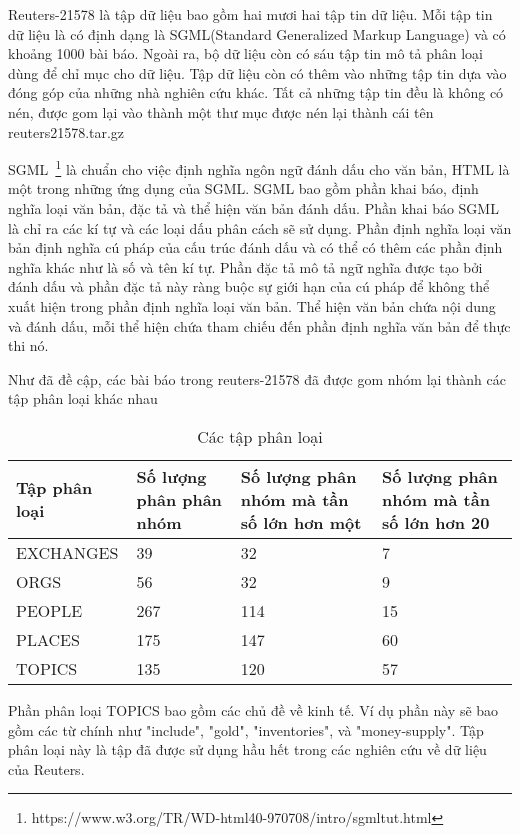 Reuters-21578 là tập dữ liệu bao gồm hai mươi hai tập tin dữ liệu.
Mỗi tập tin dữ liệu là có định dạng là SGML(Standard Generalized Markup Language) và có khoảng 1000 bài báo.
Ngoài ra, bộ dữ liệu còn có sáu tập tin mô tả phân loại dùng để chỉ mục cho dữ liệu.
Tập dữ liệu còn có thêm vào những tập tin dựa vào đóng góp của những nhà nghiên cứu khác.
Tất cả những tập tin đều là không có nén, được gom lại vào thành một thư mục được nén lại thành cái tên reuters21578.tar.gz

SGML~\footnote{https://www.w3.org/TR/WD-html40-970708/intro/sgmltut.html} là chuẩn cho việc định nghĩa ngôn ngữ đánh dấu cho văn bản, HTML là một trong những ứng dụng của SGML.
SGML bao gồm phần khai báo, định nghĩa loại văn bản, đặc tả và thể hiện văn bản đánh dấu.
Phần khai báo SGML là chỉ ra các kí tự và các loại dấu phân cách sẽ sử dụng.
Phần định nghĩa loại văn bản định nghĩa cú pháp của cấu trúc đánh dấu và có thể có thêm các phần định nghĩa khác như là số và tên kí tự.
Phần đặc tả mô tả ngữ nghĩa được tạo bởi đánh dấu và phần đặc tả này ràng buộc sự giới hạn của cú pháp để không thể xuất hiện trong phần định nghĩa loại văn bản.
Thể hiện văn bản chứa nội dung và đánh dấu, mỗi thể hiện chứa tham chiếu đến phần định nghĩa văn bản để thực thi nó.

Như đã đề cập, các bài báo trong reuters-21578 đã được gom nhóm lại thành các tập phân loại khác nhau
\begin{table}[ht]
\begin{center}
\begin{tabularx}{\textwidth}{|Y|Y|Y|Y|}
\hline
Tập phân loại & Số lượng phân phân nhóm & Số lượng phân nhóm mà tần số lớn hơn một & Số lượng phân nhóm mà tần số lớn hơn 20  \\
\hline
EXCHANGES & 39 & 32 & 7\\
\hline
ORGS & 56 & 32 & 9\\
\hline
PEOPLE & 267 & 114 & 15 \\
\hline
PLACES & 175 & 147 & 60\\
\hline
TOPICS & 135 & 120 & 57\\
\hline
\end{tabularx}
\caption[Các tập phân loại]{Các tập phân loại}
\label{bang_4_2}
\end{center}
\end{table}

Phần phân loại TOPICS bao gồm các chủ đề về kinh tế.
Ví dụ phần này sẽ bao gồm các từ chính như "include", "gold", "inventories", và "money-supply".
Tập phân loại này là tập đã được sử dụng hầu hết trong các nghiên cứu về dữ liệu của Reuters.



